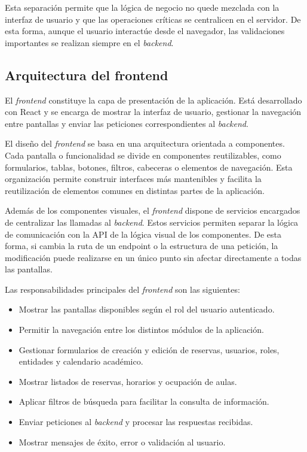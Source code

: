 Esta separación permite que la lógica de negocio no quede mezclada con la interfaz de usuario y que las operaciones críticas se centralicen en el servidor. De esta forma, aunque el usuario interactúe desde el navegador, las validaciones importantes se realizan siempre en el \textit{backend}.

\subsection{Arquitectura del frontend}

El \textit{frontend} constituye la capa de presentación de la aplicación. Está desarrollado con React y se encarga de mostrar la interfaz de usuario, gestionar la navegación entre pantallas y enviar las peticiones correspondientes al \textit{backend}.

El diseño del \textit{frontend} se basa en una arquitectura orientada a componentes. Cada pantalla o funcionalidad se divide en componentes reutilizables, como formularios, tablas, botones, filtros, cabeceras o elementos de navegación. Esta organización permite construir interfaces más mantenibles y facilita la reutilización de elementos comunes en distintas partes de la aplicación.

Además de los componentes visuales, el \textit{frontend} dispone de servicios encargados de centralizar las llamadas al \textit{backend}. Estos servicios permiten separar la lógica de comunicación con la API de la lógica visual de los componentes. De esta forma, si cambia la ruta de un endpoint o la estructura de una petición, la modificación puede realizarse en un único punto sin afectar directamente a todas las pantallas.

Las responsabilidades principales del \textit{frontend} son las siguientes:

\begin{itemize}
	\item Mostrar las pantallas disponibles según el rol del usuario autenticado.
	\item Permitir la navegación entre los distintos módulos de la aplicación.
	\item Gestionar formularios de creación y edición de reservas, usuarios, roles, entidades y calendario académico.
	\item Mostrar listados de reservas, horarios y ocupación de aulas.
	\item Aplicar filtros de búsqueda para facilitar la consulta de información.
	\item Enviar peticiones al \textit{backend} y procesar las respuestas recibidas.
	\item Mostrar mensajes de éxito, error o validación al usuario.
\end{itemize}

